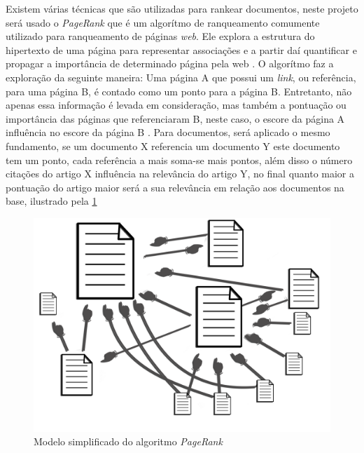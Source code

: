 Existem várias técnicas que são utilizadas para rankear documentos, neste projeto será usado o \textit{PageRank} que é um algorítmo de ranqueamento comumente utilizado para ranqueamento de páginas \textit{web}. Ele explora a estrutura do hipertexto de uma página para representar associações e a partir daí quantificar e propagar a importância de determinado página pela web \cite{langville2011google}.
O algorítmo faz a exploração da seguinte maneira: Uma página A que possui um \textit{link}, ou referência, para uma página B, é contado como um ponto para a página B. Entretanto, não apenas essa informação é levada em consideração, mas também a pontuação ou importância das páginas que referenciaram B, neste caso, o escore da página A influência no escore da página B \cite{de2006mecanismos}. 
Para documentos, será aplicado o mesmo fundamento, se um documento X referencia um documento Y este documento tem um ponto, cada referência a mais soma-se mais pontos, além disso o número citações do artigo X influência na relevância do artigo Y, no final quanto maior a pontuação do artigo maior será a sua relevância em relação aos documentos na base, ilustrado pela \ref{pagerankfig}

\begin{figure}[htb]
		\begin{center}
			\includegraphics[width=13cm]{images/pagerankgex.png}
            \caption{Modelo simplificado do algoritmo \textit{PageRank}}
            
	\label{pagerankfig}
		\end{center}
	\end{figure}



